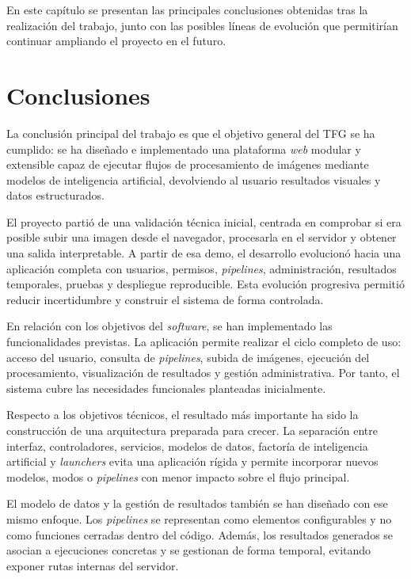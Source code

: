 
En este capítulo se presentan las principales conclusiones obtenidas tras la realización del trabajo, junto con las posibles líneas de evolución que permitirían continuar ampliando el proyecto en el futuro.

\section{Conclusiones}

La conclusión principal del trabajo es que el objetivo general del TFG se ha cumplido: se ha diseñado e implementado una plataforma \textit{web} modular y extensible capaz de ejecutar flujos de procesamiento de imágenes mediante modelos de inteligencia artificial, devolviendo al usuario resultados visuales y datos estructurados.

El proyecto partió de una validación técnica inicial, centrada en comprobar si era posible subir una imagen desde el navegador, procesarla en el servidor y obtener una salida interpretable. A partir de esa demo, el desarrollo evolucionó hacia una aplicación completa con usuarios, permisos, \textit{pipelines}, administración, resultados temporales, pruebas y despliegue reproducible. Esta evolución progresiva permitió reducir incertidumbre y construir el sistema de forma controlada.

En relación con los objetivos del \textit{software}, se han implementado las funcionalidades previstas. La aplicación permite realizar el ciclo completo de uso: acceso del usuario, consulta de \textit{pipelines}, subida de imágenes, ejecución del procesamiento, visualización de resultados y gestión administrativa. Por tanto, el sistema cubre las necesidades funcionales planteadas inicialmente.

Respecto a los objetivos técnicos, el resultado más importante ha sido la construcción de una arquitectura preparada para crecer. La separación entre interfaz, controladores, servicios, modelos de datos, factoría de inteligencia artificial y \textit{launchers} evita una aplicación rígida y permite incorporar nuevos modelos, modos o \textit{pipelines} con menor impacto sobre el flujo principal.

El modelo de datos y la gestión de resultados también se han diseñado con ese mismo enfoque. Los \textit{pipelines} se representan como elementos configurables y no como funciones cerradas dentro del código. Además, los resultados generados se asocian a ejecuciones concretas y se gestionan de forma temporal, evitando exponer rutas internas del servidor.

